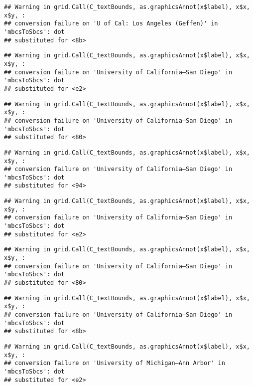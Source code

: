 \documentclass[]{article}
\begin{document}
\begin{verbatim}
## Warning in grid.Call(C_textBounds, as.graphicsAnnot(x$label), x$x, x$y, :
## conversion failure on 'U of Cal: ​Los Angeles (Geffen)' in 'mbcsToSbcs': dot
## substituted for <8b>
\end{verbatim}

\begin{verbatim}
## Warning in grid.Call(C_textBounds, as.graphicsAnnot(x$label), x$x, x$y, :
## conversion failure on 'University of California—​San Diego' in 'mbcsToSbcs': dot
## substituted for <e2>
\end{verbatim}

\begin{verbatim}
## Warning in grid.Call(C_textBounds, as.graphicsAnnot(x$label), x$x, x$y, :
## conversion failure on 'University of California—​San Diego' in 'mbcsToSbcs': dot
## substituted for <80>
\end{verbatim}

\begin{verbatim}
## Warning in grid.Call(C_textBounds, as.graphicsAnnot(x$label), x$x, x$y, :
## conversion failure on 'University of California—​San Diego' in 'mbcsToSbcs': dot
## substituted for <94>
\end{verbatim}

\begin{verbatim}
## Warning in grid.Call(C_textBounds, as.graphicsAnnot(x$label), x$x, x$y, :
## conversion failure on 'University of California—​San Diego' in 'mbcsToSbcs': dot
## substituted for <e2>
\end{verbatim}

\begin{verbatim}
## Warning in grid.Call(C_textBounds, as.graphicsAnnot(x$label), x$x, x$y, :
## conversion failure on 'University of California—​San Diego' in 'mbcsToSbcs': dot
## substituted for <80>
\end{verbatim}

\begin{verbatim}
## Warning in grid.Call(C_textBounds, as.graphicsAnnot(x$label), x$x, x$y, :
## conversion failure on 'University of California—​San Diego' in 'mbcsToSbcs': dot
## substituted for <8b>
\end{verbatim}

\begin{verbatim}
## Warning in grid.Call(C_textBounds, as.graphicsAnnot(x$label), x$x, x$y, :
## conversion failure on 'University of Michigan—​Ann Arbor' in 'mbcsToSbcs': dot
## substituted for <e2>
\end{verbatim}
\end{document}
